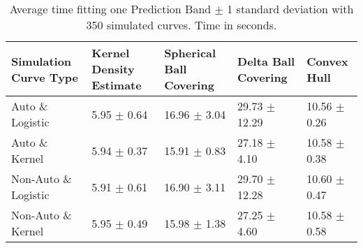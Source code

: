 \begin{table}[ht!]
\centering
\begin{tabular}{|R{1.2in}||L{.95in}L{.95in}|L{.9in}L{.9in}|}
  \hline
Simulation Curve Type & Kernel Density Estimate & Spherical Ball Covering & Delta Ball Covering & Convex Hull \\ 
  \hline
Auto \& Logistic & 5.95 \(\pm\) 0.64 & 16.96 \(\pm\) 3.04 & 29.73 \(\pm\) 12.29 & 10.56 \(\pm\) 0.26 \\ 
  Auto \& Kernel & 5.94 \(\pm\) 0.37 & 15.91 \(\pm\) 0.83 & 27.18 \(\pm\) 4.10 & 10.58 \(\pm\) 0.38 \\ 
  Non-Auto \& Logistic & 5.91 \(\pm\) 0.61 & 16.90 \(\pm\) 3.11 & 29.70 \(\pm\) 12.28 & 10.60 \(\pm\) 0.47 \\ 
  Non-Auto \& Kernel & 5.95 \(\pm\) 0.49 & 15.98 \(\pm\) 1.38 & 27.25 \(\pm\) 4.60 & 10.58 \(\pm\) 0.58 \\ 
   \hline
\end{tabular}
\caption{Average time fitting one Prediction Band \(\pm\) 1 standard deviation with 350 simulated curves. Time in seconds.} 
\label{tab:time_fitting}
\end{table}
